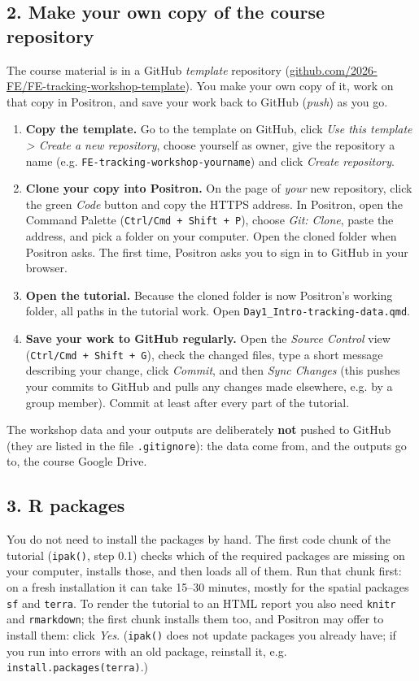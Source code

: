 \documentclass[11pt,a4paper]{article}
\begin{document}
\subsection{2. Make your own copy of the course repository}
The course material is in a GitHub \textit{template} repository (\href{https://github.com/2026-FE/FE-tracking-workshop-template}{github.com/2026-FE/FE-tracking-workshop-template}). You make your own copy of it, work on that copy in Positron, and save your work back to GitHub (\textit{push}) as you go.
\begin{enumerate}[leftmargin=*]
\item \textbf{Copy the template.} Go to the template on GitHub, click \textit{Use this template > Create a new repository}, choose yourself as owner, give the repository a name (e.g. \texttt{FE-tracking-workshop-yourname}) and click \textit{Create repository}.
\item \textbf{Clone your copy into Positron.} On the page of \textit{your} new repository, click the green \textit{Code} button and copy the HTTPS address. In Positron, open the Command Palette (\texttt{Ctrl/Cmd + Shift + P}), choose \textit{Git: Clone}, paste the address, and pick a folder on your computer. Open the cloned folder when Positron asks. The first time, Positron asks you to sign in to GitHub in your browser.
\item \textbf{Open the tutorial.} Because the cloned folder is now Positron's working folder, all paths in the tutorial work. Open \texttt{Day1\_Intro-tracking-data.qmd}.
\item \textbf{Save your work to GitHub regularly.} Open the \textit{Source Control} view (\texttt{Ctrl/Cmd + Shift + G}), check the changed files, type a short message describing your change, click \textit{Commit}, and then \textit{Sync Changes} (this pushes your commits to GitHub and pulls any changes made elsewhere, e.g. by a group member). Commit at least after every part of the tutorial.
\end{enumerate}
The workshop data and your outputs are deliberately \textbf{not} pushed to GitHub (they are listed in the file \texttt{.gitignore}): the data come from, and the outputs go to, the course Google Drive.

\subsection{3. R packages}
You do not need to install the packages by hand. The first code chunk of the tutorial (\texttt{ipak()}, step 0.1) checks which of the required packages are missing on your computer, installs those, and then loads all of them. Run that chunk first: on a fresh installation it can take 15--30 minutes, mostly for the spatial packages \texttt{sf} and \texttt{terra}. To render the tutorial to an HTML report you also need \texttt{knitr} and \texttt{rmarkdown}; the first chunk installs them too, and Positron may offer to install them: click \textit{Yes}. (\texttt{ipak()} does not update packages you already have; if you run into errors with an old package, reinstall it, e.g. \texttt{install.packages(\textquotedbl terra\textquotedbl)}.)
\end{document}
